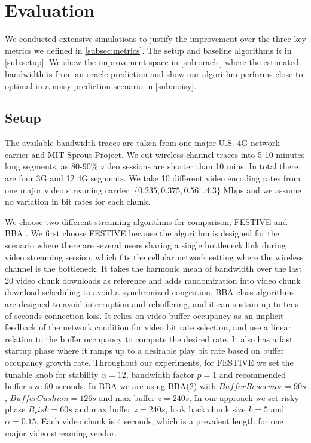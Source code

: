 
\section{Evaluation} \label{sec:evaluation}
We conducted extensive simulations to justify the improvement over the three key metrics we defined in \autoref{subsec:metrics}. The setup and baseline algorithms is in \autoref{sub:setup}. We show the improvement space in \autoref{sub:oracle} where the estimated bandwidth is from an oracle prediction and show our algorithm performs close-to-optimal in a noisy prediction scenario in \autoref{sub:noisy}. 

\subsection{Setup} \label{sub:setup}
 The available bandwidth traces are taken from one major U.S. 4G network carrier and MIT Sprout Project\cite{Sprout}. We cut wireless channel traces into 5-10 minutes long segments, as 80-90\% video sessions are shorter than 10 mins\cite{ATTVIDEO}. In total there are four 3G and 12 4G segments. We take 10 different video encoding rates from one major video streaming carrier: $\{0.235,0.375, 0.56\dots4.3\}$ Mbps \cite{NETFLIXRATE} and we assume no variation in bit rates for each chunk. 

We choose two different streaming algorithms for comparison; FESTIVE \cite{Festive} and BBA \cite{BBA}. We first choose FESTIVE because the algorithm is designed for the scenario where there are several users sharing a single bottleneck link during video streaming session, which fits the cellular network setting where the wireless channel is the bottleneck. It takes the harmonic mean of bandwidth over the last 20 video chunk downloads as reference and adds randomization into video chunk download scheduling to avoid a synchronized congestion. BBA class algorithms are designed to avoid interruption and rebuffering, and it can sustain up to tens of seconds connection loss. It relies on video buffer occupancy as an implicit feedback of the network condition for video bit rate selection, and use a linear relation to the buffer occupancy to compute the desired rate. It also has a fast startup phase where it ramps up to a desirable play bit rate based on buffer occupancy growth rate. Throughout our experiments, for FESTIVE we set the tunable knob for stability $\alpha =12 $, bandwidth factor $p=1$ and recommended buffer size 60 seconds. In BBA we are using BBA(2) with $BufferReservior=90s$, $BufferCushion=126s$ and max buffer $z=240s$. In our approach we set risky phase $B_risk=60s$ and max buffer $z=240s$, look back chunk size $k=5$ and $\alpha=0.15$. Each video chunk is 4 seconds, which is a prevalent length for one major video streaming vendor. 



